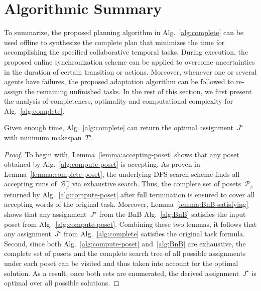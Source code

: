 \section{Algorithmic Summary}\label{subsec:summary}

To summarize, the proposed planning algorithm in Alg.~\ref{alg:complete}
can be used offline to synthesize the complete plan that
minimizes the time for accomplishing the specified collaborative temporal tasks.
During execution, the proposed online synchronization scheme can be applied to
overcome uncertainties in the duration of certain transition or actions.
Moreover, whenever one or several agents have failures, the proposed adaptation
algorithm can be followed to re-assign the remaining unfinished tasks.
In the rest of this section,
we first present the analysis of completeness, optimality and computational
complexity for Alg.~\ref{alg:complete}.

\begin{theorem}[Completeness]\label{theo:completeness}
Given enough time, Alg.~\ref{alg:complete} can return the optimal
assignment~$J^\star$ with minimum makespan~$T^\star$.
\end{theorem}
\begin{proof}
 To begin with, Lemma~\ref{lemma:accepting-poset} shows that any poset obtained
 by Alg.~\ref{alg:compute-poset} is accepting.
 As proven in Lemma~\ref{lemma:complete-poset},
 the underlying DFS search scheme finds all accepting runs of~$\mathcal{B}^-_{\varphi}$ via exhaustive search.
 Thus, the complete set of posets~$\mathcal{P}_{\varphi}$ returned by
 Alg.~\ref{alg:compute-poset} after full termination is ensured to cover all
 accepting words of the original task.
 Moreover, Lemma~\ref{lemma:BnB-satisfying} shows that any assignment~$J^\star$
 from the BnB Alg.~\ref{alg:BnB} satisfies the input poset
 from Alg.~\ref{alg:compute-poset}.
 Combining these two lemmas, it follows that any assignment~$J^\star$
 from Alg.~\ref{alg:complete} satisfies the original task formula.
 Second, since both Alg.~\ref{alg:compute-poset} and~\ref{alg:BnB} are exhaustive,
 the complete set of posets and the complete search tree of all
 possible assignments under each poset can be visited and thus taken into account
 for the optimal solution.
 As a result, once both sets are enumerated, the derived assignment~$J^\star$ is
 optimal over all possible solutions.
\end{proof}

